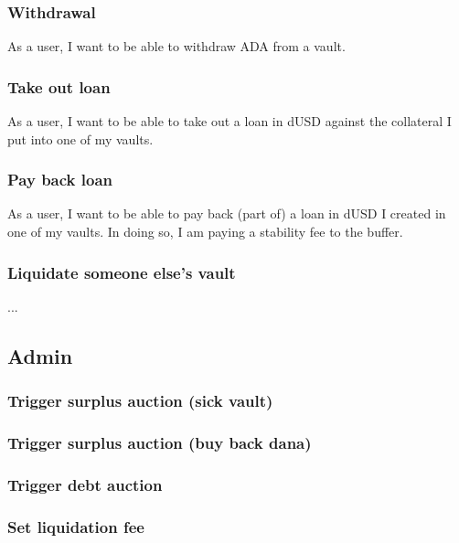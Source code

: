 \documentclass{article} %
\begin{document}
\subsubsection{Withdrawal}

As a user, I want to be able to withdraw ADA from a vault.

\subsubsection{Take out loan}

As a user, I want to be able to take out a loan in dUSD against the collateral I
put into one of my vaults.

\subsubsection{Pay back loan}

As a user, I want to be able to pay back (part of) a loan in dUSD I created in
one of my vaults. In doing so, I am paying a stability fee to the buffer.

\subsubsection{Liquidate someone else's vault}

...

\subsection{Admin}

\subsubsection{Trigger surplus auction (sick vault)}

\subsubsection{Trigger surplus auction (buy back dana)}

\subsubsection{Trigger debt auction}

\subsubsection{Set liquidation fee}
\end{document}
